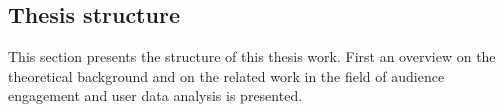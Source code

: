 \subsection{Thesis structure}
    This section presents the structure of this thesis work. First an overview on the theoretical background and on the related work in the field of audience engagement and user data analysis is presented. 

